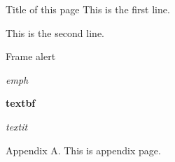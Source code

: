 
\begin{frame}{Title of this page}
  This is the first line.\par
    \pause%
  This is the second line.
\end{frame}

\begin{frame}{Frame}
  \alert{alert}\par
  \emph{emph}\par
  \textbf{textbf}\par
  \textit{textit}\par
\end{frame}

\beginappendix{} %

\begin{frame}{Appendix A.}
  This is appendix page.
\end{frame}

%  
